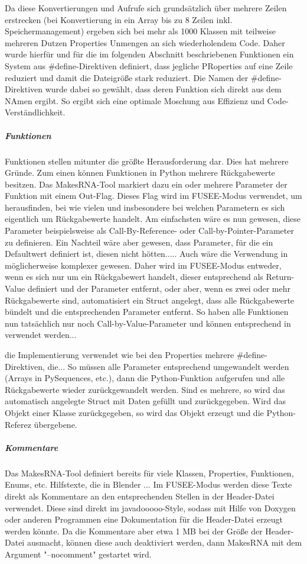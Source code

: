 Da diese Konvertierungen und Aufrufe sich grundsätzlich über mehrere Zeilen erstrecken (bei Konvertierung in ein Array bis zu 8 Zeilen inkl. Speichermanagement) ergeben sich bei mehr als 1000 Klassen mit teilweise mehreren Dutzen Properties Unmengen an sich wiederholendem Code. Daher wurde hierfür und für die im folgenden Abschnitt beschriebenen Funktionen ein System aus \#define-Direktiven definiert, dass jegliche PRoperties auf eine Zeile reduziert und damit die Dateigröße stark reduziert. Die Namen der \#define-Direktiven wurde dabei so gewählt, dass deren Funktion sich direkt aus dem NAmen ergibt. So ergibt sich eine optimale Moschung aus Effizienz und Code-Verständlichkeit.

\subparagraph{Funktionen}

Funktionen stellen mitunter die größte Herausforderung dar. Dies hat mehrere Gründe. Zum einen können Funktionen in Python mehrere Rückgabewerte besitzen. Das MakesRNA-Tool markiert dazu ein oder mehrere Parameter der Funktion mit einem Out-Flag. Dieses Flag wird im FUSEE-Modus verwendet, um herausfinden, bei wie vielen und insbesondere bei welchen Parametern es sich eigentlich um Rückgabewerte handelt. Am einfachsten wäre es nun gewesen, diese Parameter beispielsweise als Call-By-Reference- oder Call-by-Pointer-Parameter zu definieren. Ein Nachteil wäre aber gewesen, dass Parameter, für die ein Defaultwert definiert ist, diesen nicht hötten..... Auch wäre die Verwendung in \CS{} möglicherweise komplexer gewesen. Daher wird im FUSEE-Modus entweder, wenn es sich nur um ein Rückgabewert handelt, dieser entsprechend als Return-Value definiert und der Parameter entfernt, oder aber, wenn es zwei oder mehr Rückgabewerte sind, automatisiert ein Struct angelegt, dass alle Rückgabewerte bündelt und die entsprechenden Parameter entfernt. So haben alle Funktionen nun tatsächlich nur noch Call-by-Value-Parameter und können entsprechend in \CS{} verwendet werden...

die Implementierung verwendet wie bei den Properties mehrere \#define-Direktiven, die... So müssen alle Parameter entsprechend umgewandelt werden (Arrays in PySequences, etc.), dann die Python-Funktion aufgerufen und alle Rückgabewerte wieder zurückgewandelt werden. Sind es mehrere, so wird das automatisch angelegte Struct mit Daten gefüllt und zurückgegeben. Wird das Objekt einer Klasse zurückgegeben, so wird das Objekt erzeugt und die Python-Referez übergebene. 

\subparagraph{Kommentare}

Das MakesRNA-Tool definiert bereits für viele Klassen, Properties, Funktionen, Enums, etc. Hilfstexte, die in Blender ... Im FUSEE-Modus werden diese Texte direkt als Kommentare an den entsprechenden Stellen in der Header-Datei verwendet. Diese sind direkt im javadooooo-Style, sodass mit Hilfe von Doxygen oder anderen Programmen eine Dokumentation für die Header-Datei erzeugt werden könnte. Da die Kommentare aber etwa 1 MB bei der Größe der Header-Datei ausmacht, können diese auch deaktiviert werden, dann MakesRNA mit dem Argument "--nocomment" gestartet wird.

